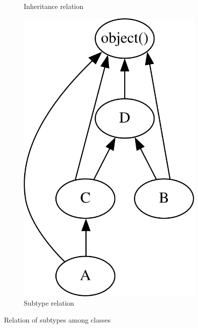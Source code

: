 \documentclass[../main.tex]{subfiles}
\begin{document}
\begin{figure}
\begin{subfigure}{.24\textwidth}
\begin{center}
      \caption{Inheritance relation}
      \label{fig:subtype}
      \end{center}
    \end{subfigure}
    \begin{subfigure}{.24\textwidth}
      \begin{center}
      \includegraphics[scale=0.7]{img/subtype_tc-big.png}
      \caption{Subtype relation}
      \label{subtype_tc}
      \end{center}
    \end{subfigure}
    
    \caption{Relation of subtypes among classes}
    \label{fig:subtypes}
    \end{figure}
\end{document}
